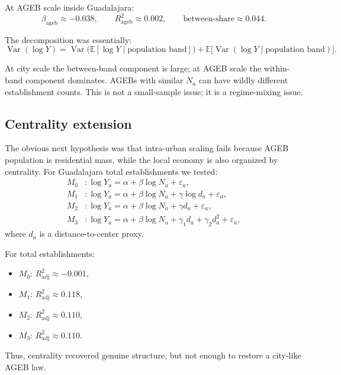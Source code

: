 \documentclass[11pt]{article}
\newcommand{\E}{\mathbb{E}}
\newcommand{\Var}{\operatorname{Var}}
\newcommand{\adjR}{R^2_{\mathrm{adj}}}
\begin{document}
At AGEB scale inside Guadalajara:
\begin{equation}
\beta_{\mathrm{ageb}} \approx -0.038,
\qquad
R^2_{\mathrm{ageb}} \approx 0.002,
\qquad
\text{between-share} \approx 0.044.
\end{equation}

The decomposition was essentially:
\begin{equation}
\Var(\log Y)
=
\Var\!\bigl(\E[\log Y \mid \text{population band}]\bigr)
+
\E\!\bigl[\Var(\log Y \mid \text{population band})\bigr].
\end{equation}

At city scale the between-band component is large; at AGEB scale the within-band component dominates. AGEBs with similar \(N_a\) can have wildly different establishment counts. This is not a small-sample issue; it is a regime-mixing issue.

\subsection{Centrality extension}

The obvious next hypothesis was that intra-urban scaling fails because AGEB population is residential mass, while the local economy is also organized by centrality. For Guadalajara total establishments we tested:
\begin{align}
M_0 &: \log Y_a = \alpha + \beta \log N_a + \varepsilon_a,\\
M_1 &: \log Y_a = \alpha + \beta \log N_a + \gamma \log d_a + \varepsilon_a,\\
M_2 &: \log Y_a = \alpha + \beta \log N_a + \gamma d_a + \varepsilon_a,\\
M_3 &: \log Y_a = \alpha + \beta \log N_a + \gamma_1 d_a + \gamma_2 d_a^2 + \varepsilon_a,
\end{align}
where \(d_a\) is a distance-to-center proxy.

For total establishments:
\begin{itemize}
\item \(M_0\): \(\adjR \approx -0.001\),
\item \(M_1\): \(\adjR \approx 0.118\),
\item \(M_2\): \(\adjR \approx 0.110\),
\item \(M_3\): \(\adjR \approx 0.110\).
\end{itemize}

Thus, centrality recovered genuine structure, but not enough to restore a city-like AGEB law.
\end{document}
